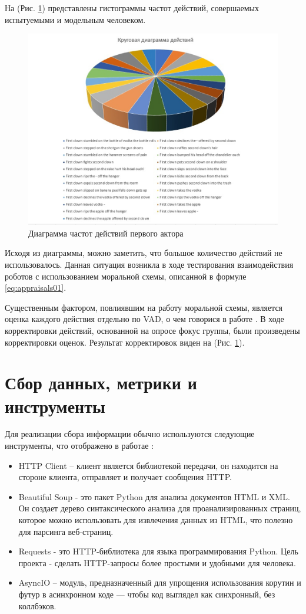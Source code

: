 На (Рис. \ref{pic:ris11}) представлены гистограммы частот действий, совершаемых испытуемыми и модельным человеком.

\begin{figure}[h]
\includegraphics[width=0.75\columnwidth]{./img/ris11.png}
\centering
\caption{Диаграмма частот действий первого актора}
\label{pic:ris11}
\end{figure}

Исходя из диаграммы, можно заметить, что большое количество действий не использовалось. 
Данная ситуация возникла в ходе тестирования взаимодействия роботов с использованием моральной схемы, описанной в формуле \ref{eq:appraisals01}.

Существенным фактором, повлиявшим на работу моральной схемы, является оценка каждого действия отдельно по VAD, о чем говорися в работе \cite{Samsonovich02}. 
В ходе корректировки действий, основанной на опросе фокус группы, были произведены корректировки оценок. 
Результат корректировок виден на (Рис. \ref{pic:ris11}).

\section{Сбор данных, метрики и инструменты}

Для реализации сбора информации обычно используются следующие инструменты,  что отображено в работае \cite{parser01} :
\begin{itemize}
  \item	HTTP Client – клиент является библиотекой передачи, он находится на стороне клиента, отправляет и получает сообщения HTTP.
  \item	Beautiful Soup - это пакет Python для анализа документов HTML и XML. Он создает дерево синтаксического анализа для проанализированных страниц, которое можно использовать для извлечения данных из HTML, что полезно для парсинга веб-страниц.
  \item	Requests - это HTTP-библиотека для языка программирования Python. Цель проекта - сделать HTTP-запросы более простыми и удобными для человека.
  \item	AsyncIO – модуль, предназначенный для упрощения использования корутин и футур в асинхронном коде — чтобы код выглядел как синхронный, без коллбэков.
\end{itemize}

